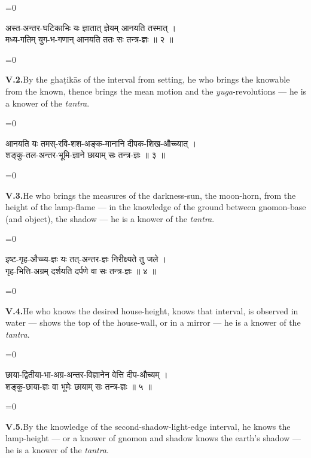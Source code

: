 \documentclass[11pt,a4paper]{article}
\newcommand{\dev}[1]{{\devanagarifont\color{sktcolor}#1}}
\newcommand{\iast}[1]{\textit{#1}}
\newenvironment{paracol}[1]{\begingroup}{\endgroup}
\newcommand{\switchcolumn}[1][]{%
  \ifnum#1=0\relax\else\par\nobreak\vspace{0.5em}\par\nobreak\fi%
}
\begin{document}
\vspace{0.3cm}

\begin{paracol}{2}
\switchcolumn[0]
\dev{%
अस्त-अन्तर-घटिकाभिः यः ज्ञातात् ज्ञेयम् आनयति तस्मात् ।\\
मध्य-गतिम् युग-भ-गणान् आनयति ततः सः तन्त्र-ज्ञः ॥ २ ॥
}

\switchcolumn[1]
\textbf{V.2.}\quad By the ghaṭikās of the interval from setting, he
who brings the knowable from the known, thence brings the mean
motion and the \iast{yuga}-revolutions — he is a knower of the
\iast{tantra}.
\end{paracol}

\vspace{0.3cm}

\begin{paracol}{2}
\switchcolumn[0]
\dev{%
आनयति यः तमस्-रवि-शश-अङ्क-मानानि दीपक-शिख-औच्च्यात् ।\\
शङ्कु-तल-अन्तर-भूमि-ज्ञाने छायाम् सः तन्त्र-ज्ञः ॥ ३ ॥
}

\switchcolumn[1]
\textbf{V.3.}\quad He who brings the measures of the darkness-sun,
the moon-horn, from the height of the lamp-flame — in the
knowledge of the ground between gnomon-base (and object), the
shadow — he is a knower of the \iast{tantra}.
\end{paracol}

\vspace{0.3cm}

\begin{paracol}{2}
\switchcolumn[0]
\dev{%
इष्ट-गृह-औच्च्य-ज्ञः यः तत्-अन्तर-ज्ञः निरीक्ष्यते तु जले ।\\
गृह-भित्ति-अग्रम् दर्शयति दर्पणे वा सः तन्त्र-ज्ञः ॥ ४ ॥
}

\switchcolumn[1]
\textbf{V.4.}\quad He who knows the desired house-height, knows
that interval, is observed in water — shows the top of the house-wall,
or in a mirror — he is a knower of the \iast{tantra}.
\end{paracol}

\vspace{0.3cm}

\begin{paracol}{2}
\switchcolumn[0]
\dev{%
छाया-द्वितीया-भा-अग्र-अन्तर-विज्ञानेन वेत्ति दीप-औच्यम् ।\\
शङ्कु-छाया-ज्ञः वा भूमेः छायाम् सः तन्त्र-ज्ञः ॥ ५ ॥
}

\switchcolumn[1]
\textbf{V.5.}\quad By the knowledge of the second-shadow-light-edge
interval, he knows the lamp-height — or a knower of gnomon and
shadow knows the earth's shadow — he is a knower of the
\iast{tantra}.
\end{paracol}
\end{document}
